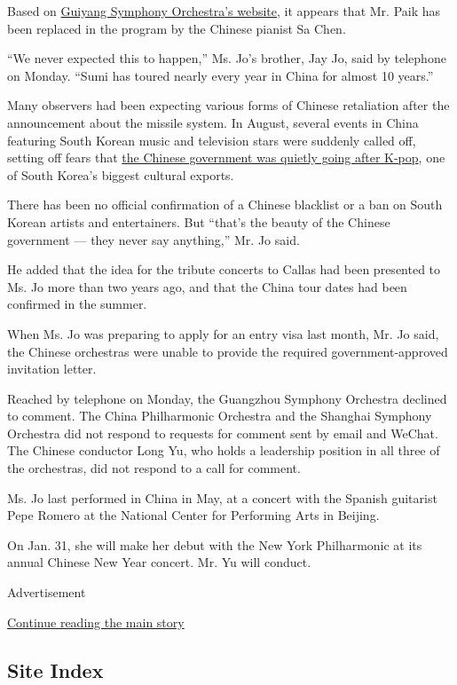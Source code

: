 Based on \href{http://www.gyso.cn/Pages/ProductDeta.aspx?Pid=26}{Guiyang
Symphony Orchestra's website}, it appears that Mr. Paik has been
replaced in the program by the Chinese pianist Sa Chen.

``We never expected this to happen,'' Ms. Jo's brother, Jay Jo, said by
telephone on Monday. ``Sumi has toured nearly every year in China for
almost 10 years.''

Many observers had been expecting various forms of Chinese retaliation
after the announcement about the missile system. In August, several
events in China featuring South Korean music and television stars were
suddenly called off, setting off fears that
\href{https://www.nytimes.com/2016/08/08/world/asia/china-korea-thaad.html}{the
Chinese government was quietly going after K-pop}, one of South Korea's
biggest cultural exports.

There has been no official confirmation of a Chinese blacklist or a ban
on South Korean artists and entertainers. But ``that's the beauty of the
Chinese government --- they never say anything,'' Mr. Jo said.

He added that the idea for the tribute concerts to Callas had been
presented to Ms. Jo more than two years ago, and that the China tour
dates had been confirmed in the summer.

When Ms. Jo was preparing to apply for an entry visa last month, Mr. Jo
said, the Chinese orchestras were unable to provide the required
government-approved invitation letter.

Reached by telephone on Monday, the Guangzhou Symphony Orchestra
declined to comment. The China Philharmonic Orchestra and the Shanghai
Symphony Orchestra did not respond to requests for comment sent by email
and WeChat. The Chinese conductor Long Yu, who holds a leadership
position in all three of the orchestras, did not respond to a call for
comment.

Ms. Jo last performed in China in May, at a concert with the Spanish
guitarist Pepe Romero at the National Center for Performing Arts in
Beijing.

On Jan. 31, she will make her debut with the New York Philharmonic at
its annual Chinese New Year concert. Mr. Yu will conduct.

Advertisement

\protect\hyperlink{after-bottom}{Continue reading the main story}

\hypertarget{site-index}{%
\subsection{Site Index}\label{site-index}}


